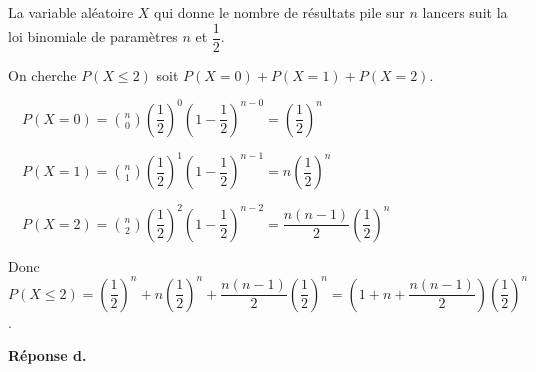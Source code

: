 \documentclass[10pt]{article}
\providecommand{\ds}{\displaystyle}
\begin{document}
\begin{enumerate}
La variable aléatoire $X$ qui donne le nombre de résultats \og pile \fg{} sur $n$ lancers suit la loi binomiale de paramètres $n$ et $\dfrac{1}{2}$.

On cherche $P(X\leqslant 2)$ soit $P(X=0)+P(X=1)+P(X=2)$.
 
\textbullet~~$P(X=0)=\ds\binom{n}{0}\left (\dfrac{1}{2}\right )^0 \left (1-\dfrac{1}{2}\right )^{n-0} = \left (\dfrac{1}{2}\right )^n$

\textbullet~~$P(X=1)=\ds\binom{n}{1}\left (\dfrac{1}{2}\right )^1 \left (1-\dfrac{1}{2}\right )^{n-1} = n \left (\dfrac{1}{2}\right )^n$

\textbullet~~$P(X=2)=\ds\binom{n}{2}\left (\dfrac{1}{2}\right )^2 \left (1-\dfrac{1}{2}\right )^{n-2} = \dfrac{n(n-1)}{2} \left (\dfrac{1}{2}\right )^n$

Donc $P(X\leqslant 2)= \left (\dfrac{1}{2}\right )^n + n \left (\dfrac{1}{2}\right )^n + \dfrac{n(n-1)}{2}\left (\dfrac{1}{2}\right )^n = \left (1+n+\dfrac{n(n-1)}{2}\right )\left (\dfrac{1}{2}\right )^n$.

\hfill\textbf{Réponse d.}
\end{enumerate}
\end{document}

